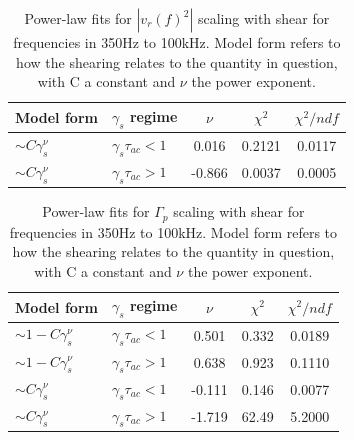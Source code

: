 \documentclass[aip,pop,amsmath,amssymb,reprint,superscriptaddress]{revtex4-1} %
\begin{document}
\begin{table}
\caption{\label{tab:table2}Power-law fits for $|v_{r}(\textit{f})^{2}|$ scaling with shear for frequencies in 350Hz to 100kHz. Model form refers to how the shearing relates to the quantity in question, with C a constant and $\nu$ the power exponent.}
\begin{ruledtabular}
\begin{tabular}{llccc}
Model form&$\gamma_{s}$ regime&$\nu$&$\chi^2$&$\chi^2/ndf$\\
\hline
$\sim C\gamma_{s}^\nu$&$\gamma_{s}\tau_{ac}<1$&0.016&0.2121&0.0117\\
$\sim C\gamma_{s}^\nu$&$\gamma_{s}\tau_{ac}>1$&-0.866&0.0037&0.0005\\
\end{tabular}
\end{ruledtabular}
\end{table}

\begin{table}
\caption{\label{tab:table3}Power-law fits for $\Gamma_{p}$ scaling with shear for frequencies in 350Hz to 100kHz. Model form refers to how the shearing relates to the quantity in question, with C a constant and $\nu$ the power exponent.}
\begin{ruledtabular}
\begin{tabular}{llccc}
Model form&$\gamma_{s}$ regime&$\nu$&$\chi^2$&$\chi^2/ndf$\\
\hline
$\sim 1-C\gamma_{s}^\nu$&$\gamma_{s}\tau_{ac}<1$ &0.501   &0.332    &0.0189\\
$\sim 1-C\gamma_{s}^\nu$&$\gamma_{s}\tau_{ac}>1$ &0.638   &0.923    &0.1110\\
$\sim C\gamma_{s}^\nu$&$\gamma_{s}\tau_{ac}<1$   &-0.111  &0.146    &0.0077\\
$\sim C\gamma_{s}^\nu$&$\gamma_{s}\tau_{ac}>1$   &-1.719  &62.49    &5.2000\\
\end{tabular}
\end{ruledtabular}
\end{table}
\end{document}
